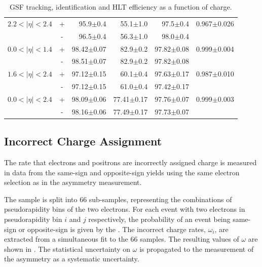 \begin{table}[htbp]
\begin{center}
\begin{tabular}{lcrrrr}
$2.2<| \eta |<2.4$ &+& 95.9$\pm$0.4 &55.1$\pm$1.0 &97.5$\pm$0.4 & 0.967$\pm$0.026\\
                   &-& 96.5$\pm$0.4 &56.3$\pm$1.0 &98.0$\pm$0.4 & \\
\midrule
$0.0<| \eta |<1.4$ &+& 98.42$\pm$0.07 &82.9$\pm$0.2 &97.82$\pm$0.08 & 0.999$\pm$0.004\\
                   &-& 98.51$\pm$0.07 &82.9$\pm$0.2 &97.82$\pm$0.08 & \\
$1.6<| \eta |<2.4$ &+& 97.12$\pm$0.15 &60.1$\pm$0.4 &97.63$\pm$0.17 & 0.987$\pm$0.010\\
                   &-& 97.12$\pm$0.15 &61.0$\pm$0.4 &97.42$\pm$0.17 & \\
\midrule
$0.0<| \eta |<2.4$ &+& 98.09$\pm$0.06 &77.41$\pm$0.17 &97.76$\pm$0.07 & 0.999$\pm$0.003\\
                   &-& 98.16$\pm$0.06 &77.49$\pm$0.17 &97.73$\pm$0.07 & \\
\bottomrule
\end{tabular}
\end{center}
\caption[GSF tracking, identification and HLT efficiency as a function of
charge.] {\label{tab:updatedefficiency} GSF tracking, identification and HLT
efficiency as a function of charge\cite{bendavid2011electron}.}
\end{table}

\subsection{Incorrect Charge Assignment}
The rate that electrons and positrons are incorrectly assigned charge is measured
in data from the same-sign and opposite-sign \PZ yields using the same electron
selection as in the asymmetry measurement.

The \HepProcess{\PZ\to\Pe\Pe} sample is split into 66 sub-samples, representing
the combinations of pseudorapidity bins of the two electrons.  For each \PZ
event with two electrons in pseudorapidity bin $i$ and $j$ respectively, the
probability of an event being same-sign or opposite-sign is given by the
. The incorrect charge rates, $\omega_i$, are
extracted from a simultaneous fit to the 66 samples.  The resulting values of
$\omega$ are shown in .
The statistical uncertainty on $\omega$ is propagated to the
measurement of the asymmetry as a systematic uncertainty.

